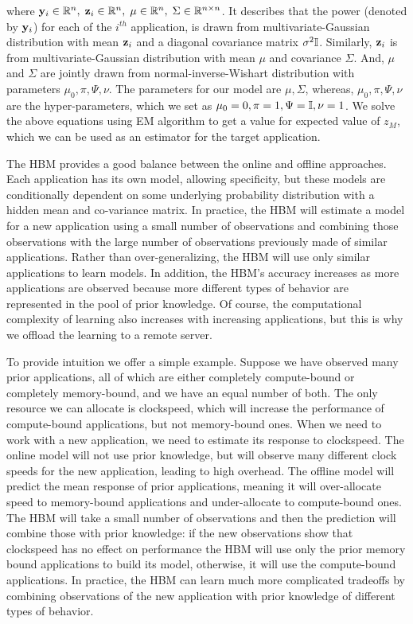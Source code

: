 where $\mathbf{y}_i \in \mathbb{R}^n, \;
\mathbf{z}_i \in \mathbb{R}^n, \;
\mu \in \mathbb{R}^{n}, \;
\Sigma \in \mathbb{R}^{n\times n}$. It describes that the power (denoted by $\mathbf{y}_i$)
for each of the $i^{th}$ application,  is drawn from multivariate-Gaussian
distribution with mean $\mathbf{z}_i$ and a diagonal covariance matrix $\sigma^2\mathbb{I}$.
Similarly, $\mathbf{z}_i$ is from multivariate-Gaussian distribution with mean $\mu$
and covariance $\Sigma$. And, $\mu$ and $\Sigma$ are jointly drawn from
normal-inverse-Wishart distribution with parameters  $\mu_0, \pi,\Psi, \nu$.
The parameters for our model are $\mu,\Sigma$, whereas,  $\mu_0, \pi,\Psi, \nu$
are the hyper-parameters, which we set as $\mu_0 = 0, \pi = 1,\Psi = \mathbb{I}, \nu = 1$. 
We solve the above equations using EM algorithm to get a value for expected value of $z_M$, which we can be used as an estimator for the target application. 


The HBM provides a good balance between the online and offline
approaches. Each application has its own model, allowing specificity, but these models
are conditionally dependent on some underlying probability
distribution with a hidden mean and co-variance matrix.  In practice,
the HBM will estimate a model for a new application using a small
number of observations and combining those observations with the large
number of observations previously made of similar applications.
Rather than over-generalizing, the HBM will use only similar
applications to learn models.  In addition, the HBM's accuracy
increases as more applications are observed because more different
types of behavior are represented in the pool of prior knowledge.  Of
course, the computational complexity of learning also increases with
increasing applications, but this is why we offload the learning to a
remote server.

To provide intuition we offer a simple example.  Suppose we have
observed many prior applications, all of which are either completely
compute-bound or completely memory-bound, and we have an equal number
of both.  The only resource we can allocate is clockspeed, which will
increase the performance of compute-bound applications, but not
memory-bound ones.  When we need to work with a new application, we
need to estimate its response to clockspeed.  The online model will
not use prior knowledge, but will observe many different clock speeds
for the new application, leading to high overhead.  The offline model
will predict the mean response of prior applications, meaning it will
over-allocate speed to memory-bound applications and under-allocate to
compute-bound ones.  The HBM will take a small number of observations
and then the prediction will combine those with prior knowledge: if
the new observations show that clockspeed has no effect on performance
the HBM will use only the prior memory bound applications to build its
model, otherwise, it will use the compute-bound applications.  In
practice, the HBM can learn much more complicated tradeoffs by
combining observations of the new application with prior knowledge of
different types of behavior.

